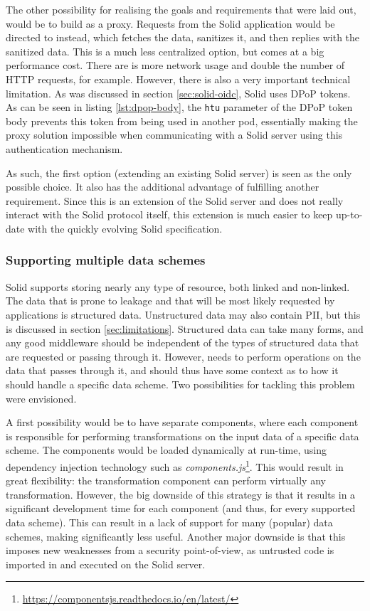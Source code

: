 The other possibility for realising the goals and requirements that were laid out, would be to build \middleware{} as a proxy. Requests from the Solid application would be directed to \middleware{} instead, which fetches the data, sanitizes it, and then replies with the sanitized data. This is a much less centralized option, but comes at a big performance cost. There are is more network usage and double the number of HTTP requests, for example. However, there is also a very important technical limitation. As was discussed in section \ref{sec:solid-oidc}, Solid uses \gls{DPoP} tokens. As can be seen in listing \ref{lst:dpop-body}, the \texttt{htu} parameter of the \gls{DPoP} token body prevents this token from being used in another pod, essentially making the proxy solution impossible when communicating with a Solid server using this authentication mechanism.

As such, the first option (extending an existing Solid server) is seen as the only possible choice. It also has the additional advantage of fulfilling another requirement. Since this is an extension of the Solid server and does not really interact with the Solid protocol itself, this extension is much easier to keep up-to-date with the quickly evolving Solid specification.

\subsubsection{Supporting multiple data schemes}
Solid supports storing nearly any type of resource, both linked and non-linked. The data that is prone to leakage and that will be most likely requested by applications is structured data. Unstructured data may also contain \gls{PII}, but this is discussed in section \ref{sec:limitations}. Structured data can take many forms, and any good middleware should be independent of the types of structured data that are requested or passing through it. However, \middleware{} needs to perform operations on the data that passes through it, and should thus have some context as to how it should handle a specific data scheme. Two possibilities for tackling this problem were envisioned.

A first possibility would be to have separate components, where each component is responsible for performing transformations on the input data of a specific data scheme. The components would be loaded dynamically at run-time, using dependency injection technology such as \textit{components.js}\footnote{\url{https://componentsjs.readthedocs.io/en/latest/}}. This would result in great flexibility: the transformation component can perform virtually any transformation. However, the big downside of this strategy is that it results in a significant development time for each component (and thus, for every supported data scheme). This can result in a lack of support for many (popular) data schemes, making \middleware{} significantly less useful. Another major downside is that this imposes new weaknesses from a security point-of-view, as untrusted code is imported in and executed on the Solid server.

